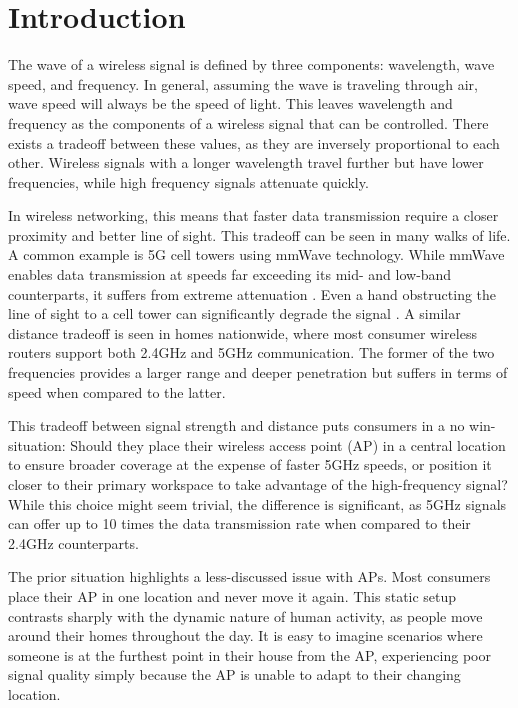 \section{Introduction}
The wave of a wireless signal is defined by three components: wavelength, wave speed, and frequency. In general, assuming the wave is traveling through air, wave speed will always be the speed of light. This leaves wavelength and frequency as the components of a wireless signal that can be controlled. There exists a tradeoff between these values, as they are inversely proportional to each other. Wireless signals with a longer wavelength travel further but have lower frequencies, while high frequency signals attenuate quickly. 

In wireless networking, this means that faster data transmission require a closer proximity and better line of sight. This tradeoff can be seen in many walks of life. A common example is 5G cell towers using mmWave technology. While mmWave enables data transmission at speeds far exceeding its mid- and low-band counterparts, it suffers from extreme attenuation \cite{mmWaveSurvey}. Even a hand obstructing the line of sight to a cell tower can significantly degrade the signal \cite{handBlock}. A similar distance tradeoff is seen in homes nationwide, where most consumer wireless routers support both 2.4GHz and 5GHz communication. The former of the two frequencies provides a larger range and deeper penetration but suffers in terms of speed when compared to the latter. 

This tradeoff between signal strength and distance puts consumers in a no win-situation: Should they place their wireless access point (AP) in a central location to ensure broader coverage at the expense of faster 5GHz speeds, or position it closer to their primary workspace to take advantage of the high-frequency signal? While this choice might seem trivial, the difference is significant, as 5GHz signals can offer up to 10 times the data transmission rate when compared to their 2.4GHz counterparts. 

The prior situation highlights a less-discussed issue with APs. Most consumers place their AP in one location and never move it again. This static setup contrasts sharply with the dynamic nature of human activity, as people move around their homes throughout the day. It is easy to imagine scenarios where someone is at the furthest point in their house from the AP, experiencing poor signal quality simply because the AP is unable to adapt to their changing location.

